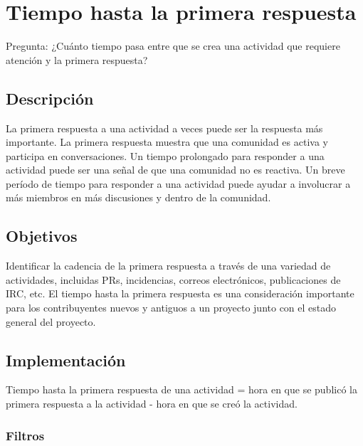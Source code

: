 \hypertarget{tiempo-hasta-la-primera-respuesta}{%
\section{Tiempo hasta la primera
respuesta}\label{tiempo-hasta-la-primera-respuesta}}

Pregunta: ¿Cuánto tiempo pasa entre que se crea una actividad que
requiere atención y la primera respuesta?

\hypertarget{descripciuxf3n}{%
\subsection{Descripción}\label{descripciuxf3n}}

La primera respuesta a una actividad a veces puede ser la respuesta más
importante. La primera respuesta muestra que una comunidad es activa y
participa en conversaciones. Un tiempo prolongado para responder a una
actividad puede ser una señal de que una comunidad no es reactiva. Un
breve período de tiempo para responder a una actividad puede ayudar a
involucrar a más miembros en más discusiones y dentro de la comunidad.

\hypertarget{objetivos}{%
\subsection{Objetivos}\label{objetivos}}

Identificar la cadencia de la primera respuesta a través de una variedad
de actividades, incluidas PRs, incidencias, correos electrónicos,
publicaciones de IRC, etc. El tiempo hasta la primera respuesta es una
consideración importante para los contribuyentes nuevos y antiguos a un
proyecto junto con el estado general del proyecto.

\hypertarget{implementaciuxf3n}{%
\subsection{Implementación}\label{implementaciuxf3n}}

Tiempo hasta la primera respuesta de una actividad = hora en que se
publicó la primera respuesta a la actividad - hora en que se creó la
actividad.

\hypertarget{filtros}{%
\subsubsection{Filtros}\label{filtros}}

